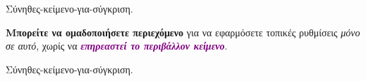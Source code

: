 Σύνηθες-κείμενο-για-σύγκριση.

 για να
{\color{red} εφαρμόσετε τοπικές} ρυθμίσεις {\itshape\color{blue}
μόνο σε αυτό}, χωρίς να {\ttfamily\slshape\bfseries\textcolor{purple}
{επηρεαστεί το περιβάλλον κείμενο}}. \egroup

Σύνηθες-κείμενο-για-σύγκριση.